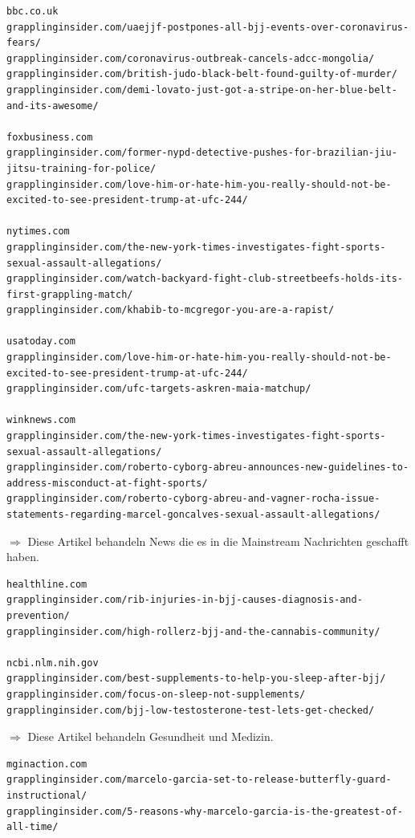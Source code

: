 {\color{MidnightBlue}
\begin{lstlisting}
bbc.co.uk
grapplinginsider.com/uaejjf-postpones-all-bjj-events-over-coronavirus-fears/
grapplinginsider.com/coronavirus-outbreak-cancels-adcc-mongolia/
grapplinginsider.com/british-judo-black-belt-found-guilty-of-murder/
grapplinginsider.com/demi-lovato-just-got-a-stripe-on-her-blue-belt-and-its-awesome/

foxbusiness.com
grapplinginsider.com/former-nypd-detective-pushes-for-brazilian-jiu-jitsu-training-for-police/
grapplinginsider.com/love-him-or-hate-him-you-really-should-not-be-excited-to-see-president-trump-at-ufc-244/

nytimes.com
grapplinginsider.com/the-new-york-times-investigates-fight-sports-sexual-assault-allegations/
grapplinginsider.com/watch-backyard-fight-club-streetbeefs-holds-its-first-grappling-match/
grapplinginsider.com/khabib-to-mcgregor-you-are-a-rapist/

usatoday.com
grapplinginsider.com/love-him-or-hate-him-you-really-should-not-be-excited-to-see-president-trump-at-ufc-244/
grapplinginsider.com/ufc-targets-askren-maia-matchup/      

winknews.com
grapplinginsider.com/the-new-york-times-investigates-fight-sports-sexual-assault-allegations/
grapplinginsider.com/roberto-cyborg-abreu-announces-new-guidelines-to-address-misconduct-at-fight-sports/
grapplinginsider.com/roberto-cyborg-abreu-and-vagner-rocha-issue-statements-regarding-marcel-goncalves-sexual-assault-allegations/
\end{lstlisting}}

\noindent$\Rightarrow$ Diese Artikel behandeln News die es in die Mainstream Nachrichten geschafft haben.

{\color{MidnightBlue}
\begin{lstlisting}
healthline.com
grapplinginsider.com/rib-injuries-in-bjj-causes-diagnosis-and-prevention/
grapplinginsider.com/high-rollerz-bjj-and-the-cannabis-community/

ncbi.nlm.nih.gov
grapplinginsider.com/best-supplements-to-help-you-sleep-after-bjj/
grapplinginsider.com/focus-on-sleep-not-supplements/
grapplinginsider.com/bjj-low-testosterone-test-lets-get-checked/
\end{lstlisting}}

\noindent$\Rightarrow$ Diese Artikel behandeln Gesundheit und Medizin.

{\color{MidnightBlue}
\begin{lstlisting}
mginaction.com
grapplinginsider.com/marcelo-garcia-set-to-release-butterfly-guard-instructional/
grapplinginsider.com/5-reasons-why-marcelo-garcia-is-the-greatest-of-all-time/
\end{lstlisting}}

